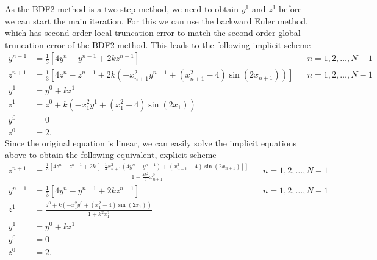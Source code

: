 \documentclass{homework}
\begin{document}
	\begin{alphaparts}
		\questionpart As the BDF2 method is a two-step method, we need to obtain $y^1$ and $z^1$ before we can start the main iteration. For this we can use the backward Euler method, which has second-order local truncation error to match the second-order global truncation error of the BDF2 method. This leads to the following implicit scheme
		\begin{align*}
			y^{n+1} &= \frac{1}{3}\left[4y^n - y^{n-1} + 2kz^{n+1}\right] && n =1,2,\dots, N-1\\
			z^{n+1} &= \frac{1}{3}\left[4z^n - z^{n-1} +2k(-x_{n+1}^2y^{n+1} + (x_{n+1}^2 - 4)\sin(2x_{n+1}))\right]&& n=1,2,\dots,N-1 \\
			y^1 &= y^0 + kz^1 \\
			z^1 &= z^0 + k(-x_1^2y^1 + (x_1^2 -4)\sin(2x_1)) \\
			y^0 &= 0 \\
			z^0 &= 2.
		\end{align*}
		Since the original equation is linear, we can easily solve the implicit equations above to obtain the following equivalent, explicit scheme
		\begin{align*}
			z^{n+1} &= \frac{\frac{1}{3}\left[4z^n - z^{n-1} + 2k\left[-\frac{1}{3}x_{n+1}^2(4y^n - y^{n-1}) + (x_{n+1}^2 - 4)\sin(2x_{n+1})\right]\right]}{1 + \frac{4k^2}{3}x_{n+1}^2} && n = 1,2,\dots,N-1\\
			y^{n+1} &= \frac{1}{3}\left[4y^n - y^{n-1} + 2kz^{n+1}\right] && n =1,2,\dots, N-1\\
			z^1 &= \frac{z^0 + k(-x_1^2y^0 + (x_1^2-4)\sin(2x_1))}{1 + k^2x_1^2} \\
			y^1 &= y^0 + kz^1 \\
			y^0 &= 0 \\
			z^0 &= 2.
		\end{align*}
		\questionpart
		

\end{alphaparts}
\end{document}
